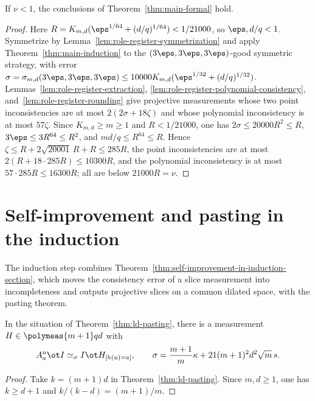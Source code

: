 \begin{lemma}\label{lem:main-formal-small-error}
	\leanok
	If $\nu<1$, the conclusions of Theorem~\ref{thm:main-formal} hold.
\end{lemma}
\begin{proof}
	\leanok
	Here $R=K_{m,d}(\eps^{1/64}+(d/q)^{1/64})<1/21000$, so $\eps,d/q<1$.
	Symmetrize by Lemma~\ref{lem:role-register-symmetrization} and apply
	Theorem~\ref{thm:main-induction} to the $(3\eps,3\eps,3\eps)$-good
	symmetric strategy, with error
	$\sigma=\sigma_{m,d}(3\eps,3\eps,3\eps)\le10000K_{m,d}(\eps^{1/32}+(d/q)^{1/32})$.
	Lemmas~\ref{lem:role-register-extraction},
	\ref{lem:role-register-polynomial-consistency},
	and~\ref{lem:role-register-rounding} give projective measurements whose
	two point inconsistencies are at most $2(2\sigma+18\zeta)$ and whose
	polynomial inconsistency is at most $57\zeta$.  Since $K_{m,d}\ge m\ge1$
	and $R<1/21000$, one has $2\sigma\le20000R^2\le R$, $3\eps\le3R^{64}\le R^2$,
	and $md/q\le R^{64}\le R$.  Hence
	$\zeta\le R+2\sqrt{20001}\,R+R\le285R$, the point inconsistencies are
	at most $2(R+18\cdot285R)\le10300R$, and the polynomial inconsistency is
	at most $57\cdot285R\le16300R$; all are below $21000R=\nu$.
\end{proof}


\section{Self-improvement and pasting in the induction}
\label{sec:self-improvement-and-pasting}

The induction step combines Theorem~\ref{thm:self-improvement-in-induction-section},
which moves the consistency error of a slice measurement into
incompleteness and outputs projective slices on a common dilated space, with
the pasting theorem.

\begin{theorem}\label{thm:ld-pasting-in-induction-section}
	\leanok
	In the situation of Theorem~\ref{thm:ld-pasting}, there is a measurement
	$H\in\polymeas{m+1}qd$ with
	\[
		A^u_a\ot I\simeq_\sigma I\ot H_{[h(u)=a]},\qquad
		\sigma=\frac{m+1}m\kappa+21(m+1)^2d^2\sqrt m\,s.
	\]
\end{theorem}
\begin{proof}
	\leanok
	Take $k=(m+1)d$ in Theorem~\ref{thm:ld-pasting}.  Since $m,d\ge1$, one
	has $k\ge d+1$ and $k/(k-d)=(m+1)/m$.
\end{proof}

